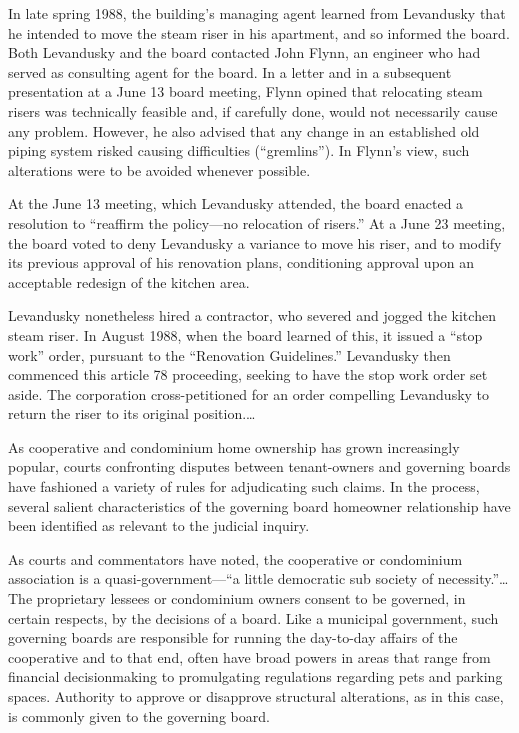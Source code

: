 In late spring 1988, the building's managing agent learned from Levandusky that
he intended to move the steam riser in his apartment, and so informed the board.
Both Levandusky and the board contacted John Flynn, an engineer who had served
as consulting agent for the board. In a letter and in a subsequent presentation
at a June 13 board meeting, Flynn opined that relocating steam risers was
technically feasible and, if carefully done, would not necessarily cause any
problem. However, he also advised that any change in an established old piping
system risked causing difficulties (``gremlins''). In Flynn's view, such
alterations were to be avoided whenever possible. 

At the June 13 meeting, which Levandusky attended, the board enacted a
resolution to ``reaffirm the policy---no relocation of risers.'' At a June 23
meeting, the board voted to deny Levandusky a variance to move his riser, and to
modify its previous approval of his renovation plans, conditioning approval upon
an acceptable redesign of the kitchen area. 

Levandusky nonetheless hired a contractor, who severed and jogged the kitchen
steam riser. In August 1988, when the board learned of this, it issued a ``stop
work'' order, pursuant to the ``Renovation Guidelines.'' Levandusky then
commenced this article 78 proceeding, seeking to have the stop work order set
aside. The corporation cross-petitioned for an order compelling Levandusky to
return the riser to its original position.\ldots 

As cooperative and condominium home ownership has grown increasingly popular,
courts confronting disputes between tenant-owners and governing boards have
fashioned a variety of rules for adjudicating such claims. In the process,
several salient characteristics of the governing board homeowner relationship
have been identified as relevant to the judicial inquiry. 

As courts and commentators have noted, the cooperative or condominium
association is a quasi-government---``a little democratic sub society of
necessity.''\ldots The proprietary lessees or condominium owners consent to be
governed, in certain respects, by the decisions of a board. Like a municipal
government, such governing boards are responsible for running the day-to-day
affairs of the cooperative and to that end, often have broad powers in areas
that range from financial decisionmaking to promulgating regulations regarding
pets and parking spaces. Authority to approve or disapprove structural
alterations, as in this case, is commonly given to the governing board. 

